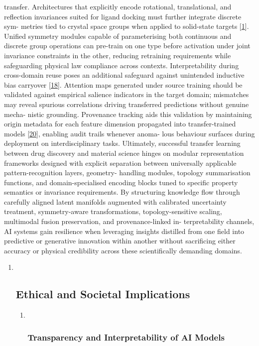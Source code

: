 \documentclass[
]{article}
\begin{document}
transfer. Architectures that explicitly encode rotational,
translational, and reflection invariances suited for ligand docking must
further integrate discrete sym- metries tied to crystal space groups
when applied to solid-state targets
{[}\protect\hyperlink{_bookmark41}{1}{]}. Unified symmetry modules
capable of parameterising both continuous and discrete group operations
can pre-train on one type before activation under joint invariance
constraints in the other, reducing retraining requirements while
safeguarding physical law compliance across contexts. Interpretability
during cross-domain reuse poses an additional safeguard against
unintended inductive bias carryover
{[}\protect\hyperlink{_bookmark58}{18}{]}. Attention maps generated
under source training should be validated against empirical salience
indicators in the target domain; mismatches may reveal spurious
correlations driving transferred predictions without genuine mecha-
nistic grounding. Provenance tracking aids this validation by
maintaining origin metadata for each feature dimension propagated into
transfer-trained models {[}\protect\hyperlink{_bookmark60}{20}{]},
enabling audit trails whenever anoma- lous behaviour surfaces during
deployment on interdisciplinary tasks. Ultimately, successful transfer
learning between drug discovery and material science hinges on modular
representation frameworks designed with explicit separation between
universally applicable pattern-recognition layers, geometry- handling
modules, topology summarisation functions, and domain-specialised
encoding blocks tuned to specific property semantics or invariance
requirements. By structuring knowledge flow through carefully aligned
latent manifolds augmented with calibrated uncertainty treatment,
symmetry-aware transformations, topology-sensitive scaling, multimodal
fusion preservation, and provenance-linked in- terpretability channels,
AI systems gain resilience when leveraging insights distilled from one
field into predictive or generative innovation within another without
sacrificing either accuracy or physical credibility across these
scientifically demanding domains.

\begin{enumerate}
\def\labelenumi{\arabic{enumi}.}
\setcounter{enumi}{1}
\item ~
  \hypertarget{ethical-and-societal-implications}{%
  \subsection{Ethical and Societal
  Implications}\label{ethical-and-societal-implications}}

  \begin{enumerate}
  \def\labelenumii{\arabic{enumii}.}
  \item ~
    \hypertarget{transparency-and-interpretability-of-ai-models}{%
    \subsubsection{Transparency and Interpretability of AI
    Models}\label{transparency-and-interpretability-of-ai-models}}
  \end{enumerate}
\end{enumerate}
\end{document}
